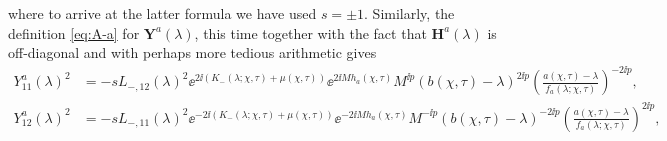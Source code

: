 where to arrive at the latter formula we have used $s=\pm 1$. Similarly, the definition \eqref{eq:A-a} for $\mathbf{Y}^{a}(\lambda)$, this time together with the fact that $\mathbf{H}^a(\lambda)$ is off-diagonal and with perhaps more tedious arithmetic gives
\begin{align}
Y^a_{11}(\lambda)^2 &= - s L_{-,12}(\lambda)^2 \ee^{2\ii (K_-(\lambda;\chi,\tau) + \mu(\chi,\tau) )} \ee^{2\ii M {h}_a(\chi,\tau)} M^{\ii p} (b(\chi,\tau)-\lambda)^{2\ii p} \left( \frac{a(\chi,\tau) - \lambda}{f_a(\lambda;\chi,\tau)} \right)^{-2\ii p},
\label{eq:A-a-11}\\
Y^a_{12}(\lambda)^2 &= - s L_{-,11}(\lambda)^2 \ee^{-2 \ii (K_-(\lambda;\chi,\tau) + \mu(\chi,\tau) ) } \ee^{-2\ii M {h}_a(\chi,\tau)} M^{-\ii p}(b(\chi,\tau)-\lambda)^{-2\ii p} \left( \frac{a(\chi,\tau) - \lambda}{f_a(\lambda;\chi,\tau)} \right)^{2\ii p},
\label{eq:A-a-12}
\end{align}

